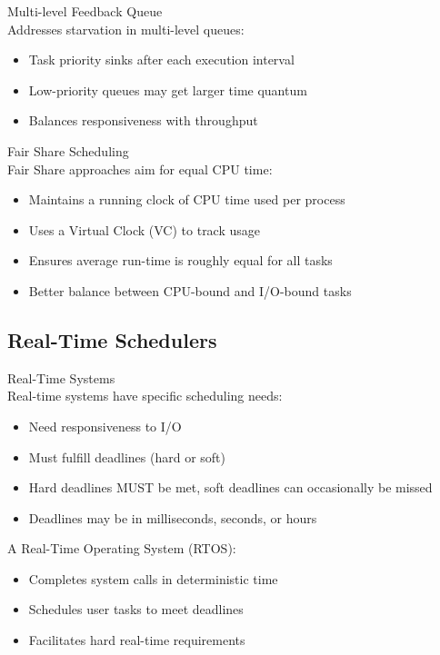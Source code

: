 \begin{definition}{Multi-level Feedback Queue}\\
    Addresses starvation in multi-level queues:
    \begin{itemize}
        \item Task priority sinks after each execution interval
        \item Low-priority queues may get larger time quantum
        \item Balances responsiveness with throughput
    \end{itemize}
\end{definition}

\begin{definition}{Fair Share Scheduling}\\
    Fair Share approaches aim for equal CPU time:
    \begin{itemize}
        \item Maintains a running clock of CPU time used per process
        \item Uses a Virtual Clock (VC) to track usage
        \item Ensures average run-time is roughly equal for all tasks
        \item Better balance between CPU-bound and I/O-bound tasks
    \end{itemize}
\end{definition}

\subsection{Real-Time Schedulers}

\begin{definition}{Real-Time Systems}\\
    Real-time systems have specific scheduling needs:
    \begin{itemize}
        \item Need responsiveness to I/O
        \item Must fulfill deadlines (hard or soft)
        \item Hard deadlines MUST be met, soft deadlines can occasionally be missed
        \item Deadlines may be in milliseconds, seconds, or hours
    \end{itemize}
    
    A Real-Time Operating System (RTOS):
    \begin{itemize}
        \item Completes system calls in deterministic time
        \item Schedules user tasks to meet deadlines
        \item Facilitates hard real-time requirements
    \end{itemize}
\end{definition}

